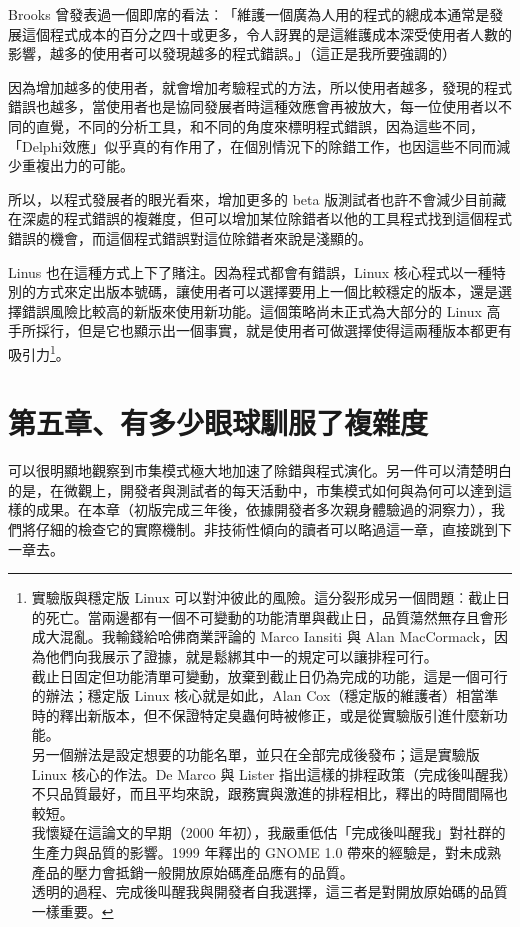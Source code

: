 \documentclass[12pt,]{article}
\begin{document}
Brooks
曾發表過一個即席的看法︰「維護一個廣為人用的程式的總成本通常是發展這個程式成本的百分之四十或更多，令人訝異的是這維護成本深受使用者人數的影響，越多的使用者可以發現越多的程式錯誤。」（這正是我所要強調的）

因為增加越多的使用者，就會增加考驗程式的方法，所以使用者越多，發現的程式錯誤也越多，當使用者也是協同發展者時這種效應會再被放大，每一位使用者以不同的直覺，不同的分析工具，和不同的角度來標明程式錯誤，因為這些不同，「Delphi效應」似乎真的有作用了，在個別情況下的除錯工作，也因這些不同而減少重複出力的可能。

所以，以程式發展者的眼光看來，增加更多的 beta
版測試者也許不會減少目前藏在深處的程式錯誤的複雜度，但可以增加某位除錯者以他的工具程式找到這個程式錯誤的機會，而這個程式錯誤對這位除錯者來說是淺顯的。

Linus 也在這種方式上下了賭注。因為程式都會有錯誤，Linux
核心程式以一種特別的方式來定出版本號碼，讓使用者可以選擇要用上一個比較穩定的版本，還是選擇錯誤風險比較高的新版來使用新功能。這個策略尚未正式為大部分的
Linux
高手所採行，但是它也顯示出一個事實，就是使用者可做選擇使得這兩種版本都更有吸引力\footnote{實驗版與穩定版
  Linux
  可以對沖彼此的風險。這分裂形成另一個問題︰截止日的死亡。當兩邊都有一個不可變動的功能清單與截止日，品質蕩然無存且會形成大混亂。我輸錢給哈佛商業評論的
  Marco Iansiti 與 Alan
  MacCormack，因為他們向我展示了證據，就是鬆綁其中一的規定可以讓排程可行。\\截止日固定但功能清單可變動，放棄到截止日仍為完成的功能，這是一個可行的辦法；穩定版
  Linux 核心就是如此，Alan
  Cox（穩定版的維護者）相當準時的釋出新版本，但不保證特定臭蟲何時被修正，或是從實驗版引進什麼新功能。\\另一個辦法是設定想要的功能名單，並只在全部完成後發布；這是實驗版
  Linux 核心的作法。De Marco 與 Lister
  指出這樣的排程政策（完成後叫醒我）不只品質最好，而且平均來說，跟務實與激進的排程相比，釋出的時間間隔也較短。\\我懷疑在這論文的早期（2000
  年初），我嚴重低估「完成後叫醒我」對社群的生產力與品質的影響。1999
  年釋出的 GNOME 1.0
  帶來的經驗是，對未成熟產品的壓力會抵銷一般開放原始碼產品應有的品質。\\透明的過程、完成後叫醒我與開發者自我選擇，這三者是對開放原始碼的品質一樣重要。}。

\newpage
\section{第五章、有多少眼球馴服了複雜度}

可以很明顯地觀察到市集模式極大地加速了除錯與程式演化。另一件可以清楚明白的是，在微觀上，開發者與測試者的每天活動中，市集模式如何與為何可以達到這樣的成果。在本章（初版完成三年後，依據開發者多次親身體驗過的洞察力），我們將仔細的檢查它的實際機制。非技術性傾向的讀者可以略過這一章，直接跳到下一章去。
\end{document}
